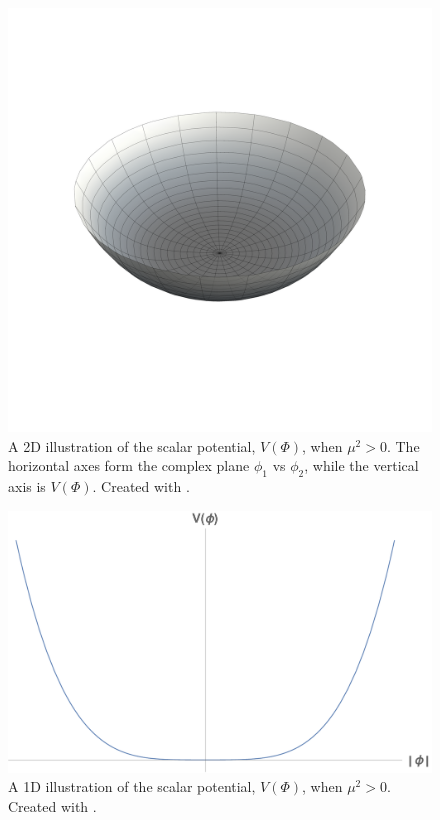 \begin{figure}
\begin{center}
\includegraphics[width=0.75\linewidth]{Introduction/Non_Mexican_Hat.pdf}
\caption[A 2D illustration of the scalar potential, $V\left(\Phi\right)$, when $\mu^2 > 0$. The horizontal axes form the complex plane $\phi_{1}$ vs $\phi_{2}$, while the vertical axis is $V\left(\Phi\right)$.]{A 2D illustration of the scalar potential, $V\left(\Phi\right)$, when $\mu^2 > 0$. The horizontal axes form the complex plane $\phi_{1}$ vs $\phi_{2}$, while the vertical axis is $V\left(\Phi\right)$. Created with \cite{Mathematica10_1}.}
\label{fig:2Dsymmetry}
\end{center}
\end{figure}

\begin{figure}
\begin{center}
\includegraphics[width=0.75\linewidth]{Introduction/Non_Mexican_Hat_1D.pdf}
\caption[A 1D illustration of the scalar potential, $V\left(\Phi\right)$, when $\mu^2 > 0$.]{A 1D illustration of the scalar potential, $V\left(\Phi\right)$, when $\mu^2 > 0$. Created with \cite{Mathematica10_1}.}
\label{fig:1Dsymmetry}
\end{center}
\end{figure}

